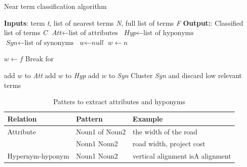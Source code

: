 \documentclass[Journal, InsideFigs, DoubleSpace]{ascelike} %
\begin{document}
%
\begin{algorithm}[h]
	
	\caption{Near term classification algorithm}\label{alg:term_class}
	\begin{algorithmic}[1]
		\State \textbf{Inputs}: term \textit{t}, list of nearest terms \textit{N}, full list of terms \textit{F}
		\State \textbf{Output:}: Classified list of terms \textit{C}
		\State $\textit{Att} \gets \text{list of attributes}$
		\State $\textit{Hyp} \gets \text{list of hyponyms}$
		\State $\textit{Syn} \gets \text{list of synonyms}$
		\State $\textit{w} \gets \textit{null}$
		\State $w \gets n$
		
		\Else
		\State $w \gets f$	
		\State Break for
		
		\EndIf
		\EndFor
		\EndIf
		\EndFor
		\State add $w$ to \textit{Att}
		\State add $w$ to \textit{Hyp}
		\Else
		\State add $w$ to \textit{Syn}
		\EndIf
		\State Cluster \textit{Syn} and discard low relevant terms
		
		\EndProcedure
	\end{algorithmic}
\end{algorithm}
%
%
\begin{table} [t]
	\caption{Patters to extract attributes and hyponyms}
	\label{table:attribute_pattern}
	\centering
	\small
	\renewcommand{\arraystretch}{1.25}
	\begin{tabular}{l l l}
		\hline
		\textbf{Relation} & \textbf{Pattern} & \textbf{Example}\\
		\hline
		Attribute &	Noun1 of Noun2 & the width of the road\\
		& Noun1 Noun2	&	road width, project cost\\
		Hypernym-hyponym & Noun1 Noun2 & vertical alignment isA alignment\\
		\hline
	\end{tabular}
	\normalsize
\end{table}
\end{document}
